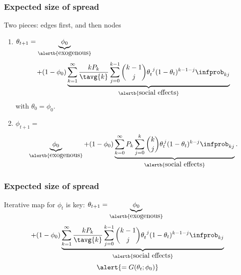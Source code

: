 \begin{frame}
  \frametitle{Expected size of spread}
  
  \begin{block}{Two pieces: edges first, and then nodes}
    \begin{enumerate}
    \item<1->
      $
      \theta_{t+1}
      =
      \underbrace{\phi_0}_{\alertb{\mbox{exogenous}}} 
      $
      $$
      +
      (1-\phi_0)
      \underbrace{
      \sum_{k=1}^{\infty}
      \frac{k P_k}{\tavg{k}}
      \sum_{j=0}^{k-1}
      \binom{k-1}{j}
      \theta_{t}^{\ j}
      (1-\theta_{t})^{k-1-j}
      \infprob_{kj}
      }_{\alertb{\mbox{social effects}}}
      $$
      with $\theta_0 = \phi_0$.
    \item<1->
      $ 
      \phi_{t+1}
      = 
      $
      $$
      \underbrace{\phi_0}_{\alertb{\mbox{exogenous}}} 
      + 
      (1-\phi_{0})
      \underbrace{
      \sum_{k=0}^{\infty}
      P_k
      \sum_{j=0}^{k}
      \binom{k}{j}
      \theta_t^{\, j}
      (1-\theta_t)^{k-j} 
      \infprob_{kj}
      }_{\alertb{\mbox{social effects}}}.
      $$
    \end{enumerate}
  \end{block}

\end{frame}

\begin{frame}
  \frametitle{Expected size of spread}
  
  \begin{block}{Iterative map for $\phi_t$ is key:}
      $
      \theta_{t+1}
      =
      \underbrace{\phi_0}_{\alertb{\mbox{exogenous}}} 
      $
      $$
      +
      (1-\phi_0)
      \underbrace{
      \sum_{k=1}^{\infty}
      \frac{k P_k}{\tavg{k}}
      \sum_{j=0}^{k-1}
      \binom{k-1}{j}
      \theta_{t}^{\ j}
      (1-\theta_{t})^{k-1-j}
      \infprob_{kj}
      }_{\alertb{\mbox{social effects}}}
      $$
      $$
      \alert{= G(\theta_t;\phi_0)}
      $$
  \end{block}

\end{frame}


